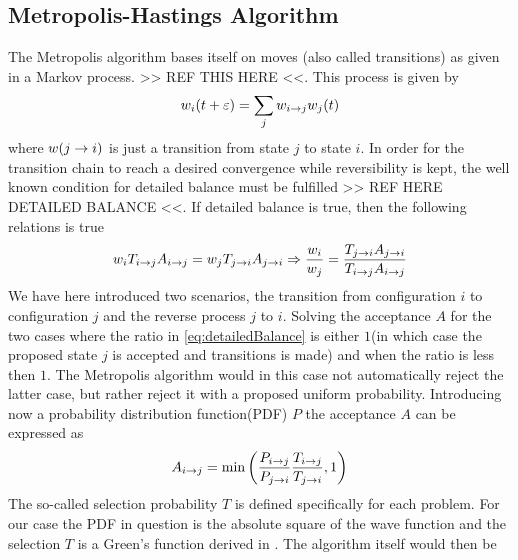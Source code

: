     \subsection{Metropolis-Hastings Algorithm\label{susec:MHAlg}}
        The Metropolis algorithm bases itself on moves (also called
        transitions) as given in a Markov process. >> REF THIS HERE <<. This
        process is given by
            \begin{equation}
                w_i(t+\varepsilon) = \sum_jw_{i\rightarrow j}w_j(t)
            \end{equation}
        where $w(j\rightarrow i)$ is just a transition from state $j$ to state $i$.
        In order for the transition chain to reach a desired convergence while
        reversibility is kept, the well known condition for detailed balance
        must be fulfilled >> REF HERE DETAILED BALANCE <<. If detailed balance
        is true, then the following relations is true
            \begin{equation}
                w_i T_{i\rightarrow j}A_{i\rightarrow j} = w_j T_{j\rightarrow i}A_{j\rightarrow i}
                \Rightarrow \frac{w_i}{w_j} =
                \frac{T_{j\rightarrow i}A_{j\rightarrow i}}{T_{i\rightarrow j}A_{i\rightarrow j}}
                \label{eq:detailedBalance}
            \end{equation}
        We have here introduced two scenarios, the transition from
        configuration $i$ to configuration $j$ and the reverse process $j$ to
        $i$. Solving the acceptance $A$ for the two cases where the ratio in
        \ref{eq:detailedBalance} is either $1$(in which case the proposed state
        $j$ is accepted and transitions is made) and when the ratio is less
        then $1$. The Metropolis algorithm would in this case not automatically
        reject the latter case, but rather reject it with a proposed uniform
        probability. Introducing now a probability distribution function(PDF) $P$
        the acceptance $A$ can be expressed as
            \begin{equation}
                A_{i\rightarrow j} =
                \text{min}\left(\frac{P_{i\rightarrow j}}{P_{j\rightarrow i}}
                \frac{T_{i\rightarrow j}}{T_{j\rightarrow i}} ,1\right)
                \label{eq:metropolisAcceptance}
            \end{equation}
        The so-called selection probability $T$ is defined specifically for
        each problem. For our case the PDF in question is the absolute square
        of the wave function and the selection $T$ is a Green's function
        derived in .  The algorithm itself would then be
